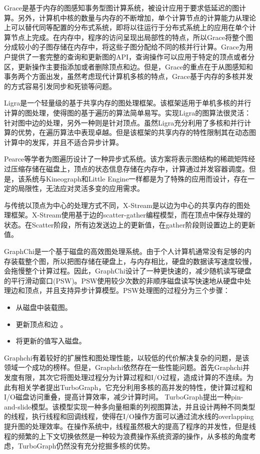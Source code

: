 Grace\cite{prabhakaran2012managing}是基于内存的图感知事务型图计算系统，被设计应用于要求低延迟的图计算。另外，计算机中核的数量与内存的不断增加，单个计算节点的计算能力从理论上可以替代同等配置的分布式系统，即将以往运行于分布式系统上的应用在单个计算节点上完成。在内存中，程序的访问呈现出局部性的特点，所以Grace将整个图分成较小的子图存储在内存中，将这些子图分配给不同的核并行计算。Grace为用户提供了一套完整的查询和更新图的API，查询操作可以应用于特定的顶点或者分区，更新操作主要指添加或者删除顶点和边。但是，Grace的重点在于从图感知和事务两个方面出发，虽然考虑现代计算机多核的特点，Grace基于内存的多核并发的方式容易引发同步和死锁等问题。

Ligra\cite{shun2013ligra}是一个轻量级的基于共享内存的图处理框架。该框架适用于单机多核的并行计算的图处理，使得图的基于遍历的算法简单易写。实现Ligra的图算法很灵活：针对图中边的处理，另外一种则是针对顶点。虽然Ligra充分利用了多核和并行计算的优势，在遍历算法中表现卓越。但是该框架的共享内存的特性限制其在动态图计算中的发挥，并且不适合异步计算。

Pearce\cite{pearce2010multithreaded}等学者为图遍历设计了一种异步式系统。该方案将表示图结构的稀疏矩阵经过压缩存储在磁盘上，顶点的状态信息存储在内存中，计算通过并发容器调度。但是，该系统与Kineograph和Little Engine一样都是为了特殊的应用而设计，存在一定的局限性，无法应对灵活多变的应用需求。

与传统以顶点为中心的处理方式不同，X-Stream\cite{roy2013x}是以边为中心的共享内存的图处理框架。X-Stream\cite{roy2013x}使用基于边的scatter-gather编程模型，而在顶点中保存处理的状态。在Scatter阶段，所有边发送边上的更新值，在gather阶段则设置边上的更新值。

GraphChi\cite{kyrola2012graphchi}是一个基于磁盘的高效图处理系统。由于个人计算机通常没有足够的内存装载整个图，所以把图存储在硬盘上，与内存相比，硬盘的数据读写速度较慢，会拖慢整个计算过程。因此，GraphChi设计了一种更快速的，减少随机读写硬盘的平行滑动窗口(PSW)。PSW使用较少次数的非顺序磁盘读写快速地从硬盘中处理边和顶点，并且支持异步计算模型。PSW处理图的过程分为三个步骤：
\begin{itemize}
\item 从磁盘中装载图。
\item 更新顶点和边 。
\item 将更新的值写入磁盘。
\end{itemize}
Graphchi有着较好的扩展性和图处理性能，以较低的代价解决复杂的问题，是该领域一个成功的榜样。但是，Graphchi依然存在一些性能问题。首先Graphchi并发度有限，其次它将图处理过程分为计算过程和I/O过程，造成计算的不连续。为此有相关学者提出TurboGraph，它充分利用多核的高并发的特性，使计算过程和I/O磁盘访问重叠，提高计算效率，减少计算时间。
TurboGraph\cite{han2013turbograph}提出一种pin-and-slide模型。该模型实现一种多向量相乘的列视图算法，并且设计两种不同类型的线程，执行线程和回调线程，使得在I/O操作方面可以通过流水线的overlapping提升图的处理效率。在操作系统中，线程虽然极大的提高了程序的并发性，但是线程的频繁的上下文切换依然是一种较为浪费操作系统资源的操作，从多核的角度考虑，TurboGraph仍然没有充分挖掘多核的优势。

